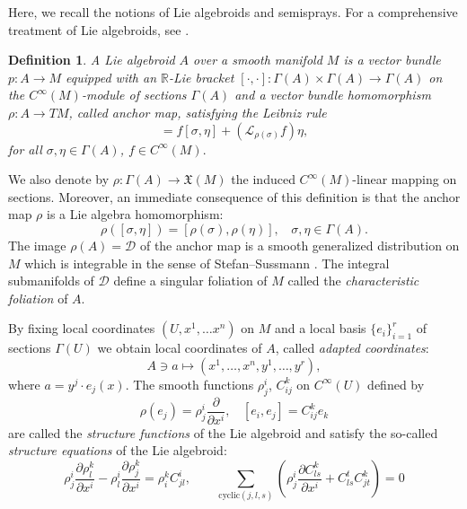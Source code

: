 \documentclass[12pt,letterpaper]{article}
\newtheorem{definition}[theorem]{Definition}
\numberwithin{equation}{section}
\begin{document}
Here, we recall the notions of Lie algebroids and semisprays.
For a comprehensive treatment of Lie algebroids, see \cite{Mackenzie2005}.

\begin{definition}
A \emph{Lie algebroid} $A$ over a smooth manifold $M$ is a vector bundle $p: A \rightarrow M$ equipped with an $\mathbb{R}$-Lie bracket $[ \cdot,\cdot ]: \Gamma(A)\times \Gamma(A)\rightarrow \Gamma(A) $ on the $C^\infty(M)$-module of sections $\Gamma(A)$ and a vector bundle homomorphism $\rho : A \rightarrow TM $, called anchor map, satisfying the Leibniz rule
\begin{equation*}
[\sigma, f \eta ] =  f[\sigma,\eta] + (\mathcal{L}_{\rho(\sigma)}f)\eta,
\end{equation*}
for all $\sigma,\eta \in \Gamma(A)$, $f\in C^\infty(M).$
\end{definition}

We also denote by $\rho: \Gamma(A) \rightarrow \mathfrak{X}(M)$ the induced  $C^\infty(M)$-linear mapping on sections. Moreover, an immediate consequence of this definition is that the anchor map  $\rho$ is a Lie algebra  homomorphism:
\begin{equation*}
\rho([ \sigma, \eta ]) = [\rho(\sigma),\rho(\eta) ], \ \ \ \  \sigma,\eta\in \Gamma(A).
\end{equation*}
The image $\rho(A)= \mathcal{D}$ of the anchor map is a smooth generalized distribution on $M$ which is integrable in the sense of Stefan--Sussmann \cite{stefan-1974, sussman-1973}. 
The integral submanifolds of $\mathcal{D}$ define a singular foliation of $M$ called the \emph{characteristic foliation} of $A$.

By fixing local coordinates $(U, x^1,\ldots x^n)$ on $M$ and a local basis $\{ e_i \}_{i=1}^r$ of sections $\Gamma(U)$ we obtain local coordinates of $A$, called \emph{adapted coordinates}:
\begin{equation}
 A \ni a \mapsto (x^1,\ldots,x^n,y^1,\ldots,y^r),\label{adapcoord}
\end{equation} 
where $a = y^j \cdot e_j (x).$ The smooth functions $\rho^i_j$, $C^k_{ij}$ on $C^\infty(U)$ defined by
\begin{equation}
\rho(e_j)=\rho^i_j\frac{\partial}{\partial x^i}, \ \ \ \ [ e_i,e_j ]= C^k_{ij}e_k \label{strucfunc}
\end{equation} 
are called the \emph{structure functions} of the Lie algebroid and satisfy the so-called \emph{structure equations} of the Lie algebroid:
\begin{equation}\label{compconditions} 
\rho^i_j\frac{\partial \rho^k_l }{\partial x^i}- \rho^i_l\frac{\partial \rho^k_j }{\partial x^i}= \rho_i^kC^i_{jl}, 
\qquad
\sum_{\mathrm{cyclic}(j,l,s)}\left( \rho^i_j\frac{\partial C^k_{ls} }{\partial x^i} + C^t_{ls} C^k_{jt}\right)=0
\end{equation}
\end{document}
